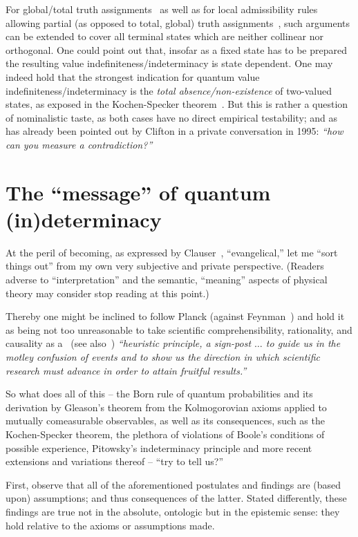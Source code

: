 \documentclass[%
  twocolumn,
 showpacs,
 showkeys,
 preprintnumbers,
 amsmath,amssymb,
 aps,
  pra,
  longbibliography,
 ]{revtex4-1}
\begin{document}
For global/total truth assignments~\citep{pitowsky:218,hru-pit-2003}
as well as for local admissibility rules allowing partial (as opposed to total, global) truth assignments~\citep{2012-incomput-proofsCJ,2015-AnalyticKS},
such arguments can be extended to cover all terminal states which are neither collinear nor orthogonal.
One could point out that, insofar as a fixed state has to be prepared the resulting value indefiniteness/indeterminacy is state dependent.
One may indeed hold that the strongest indication for quantum value indefiniteness/indeterminacy is the {\em total absence/non-existence} of two-valued states,
as exposed in the Kochen-Specker theorem~\citep{kochen1}.
But this is rather a question of nominalistic taste, as both cases have no direct empirical testability;
and as has already been pointed out by Clifton in a private conversation in 1995: {\em ``how can you measure a contradiction?''}

\section{The ``message'' of quantum (in)determinacy}

At the peril of becoming, as expressed by Clauser~\citep{clauser-talkvie}, ``evangelical,''
let me ``sort things out'' from my own very subjective and private perspective.
(Readers adverse to ``interpretation'' and the semantic, ``meaning'' aspects of physical theory may consider stop reading at this point.)

Thereby one might be inclined to follow Planck (against Feynman~\citep{clauser-talkvie,mermin-1989-shutup,mermin-2004-shutup})
and hold it as being not too unreasonable
to take scientific comprehensibility, rationality, and causality
as a~\cite[p.~539]{Planck-32-coc}
(see also~\cite[p.~1372]{Earman20071369}) {\em ``heuristic principle, a sign-post $\ldots$ to guide us in the motley confusion of events and to show us the direction
in which scientific research must advance in order to attain fruitful results.''}

So what does all of this
--
the Born rule of quantum probabilities and its derivation by Gleason's theorem from the
Kolmogorovian axioms applied to mutually comeasurable observables,
as well as its consequences, such as
the Kochen-Specker theorem, the plethora of violations of Boole's conditions of possible experience, Pitowsky's  indeterminacy principle
and more recent extensions and variations thereof
--
``try to tell us?''

First, observe that all of the aforementioned postulates and findings are
(based upon) assumptions;  and thus consequences of the latter. Stated differently,
these findings are true not in the absolute, ontologic but in the epistemic sense:
they hold relative to the axioms or assumptions made.
\end{document}
